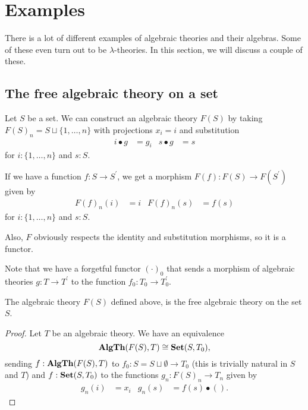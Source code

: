 \section{Examples}

There is a lot of different examples of algebraic theories and their algebras. Some of these even turn out to be $ \lambda $-theories. In this section, we will discuss a couple of these.

\subsection{The free algebraic theory on a set}
\begin{example}
  Let $ S $ be a set. We can construct an algebraic theory $ F(S) $ by taking $ F(S)_n = S \sqcup \{ 1, \dots, n \} $ with projections $ x_i = i $ and substitution
  \begin{align*}
    i \bullet g &= g_i & s \bullet g &= s
  \end{align*}
  for $ i : \{ 1, \dots, n \} $ and $ s : S $.

  If we have a function $ f: S \to S^\prime $, we get a morphism $ F(f): F(S) \to F(S^\prime) $ given by
  \begin{align*}
    F(f)_n(i) &= i & F(f)_n(s) &= f(s)
  \end{align*}
  for $ i : \{ 1, \dots, n \} $ and $ s : S $.

  Also, $ F $ obviously respects the identity and substitution morphisms, so it is a functor.
\end{example}

Note that we have a forgetful functor $ (\cdot)_0 $ that sends a morphism of algebraic theories $ g: T \to T^\prime $ to the function $ f_0: T_0 \to T^\prime_0 $.

\begin{lemma}
  The algebraic theory $ F(S) $ defined above, is the free algebraic theory on the set $ S $.
\end{lemma}
\begin{proof}
  Let $ T $ be an algebraic theory. We have an equivalence
  \[ \mathbf{AlgTh}(F(S), T) \cong \mathbf{Set}(S, T_0), \]
  sending $ f: \mathbf{AlgTh}(F(S), T) $ to $ f_0: S = S \sqcup \emptyset \to T_0 $ (this is trivially natural in $ S $ and $ T $) and $ f: \mathbf{Set}(S, T_0) $ to the functions $ g_n: F(S)_n \to T_n $ given by
  \begin{align*}
    g_n(i) &= x_i & g_n(s) &= f(s) \bullet ().
  \end{align*}
\end{proof}

